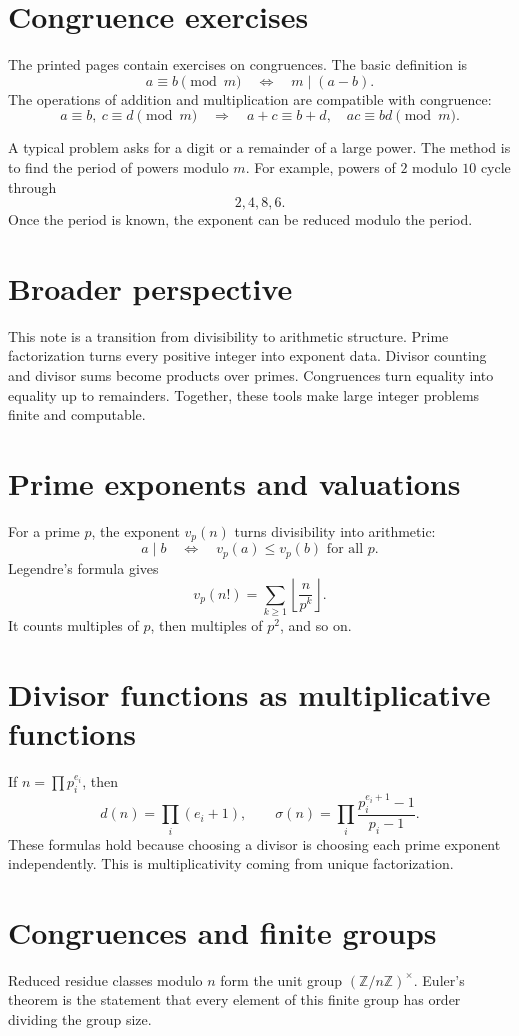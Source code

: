 \section{Congruence exercises}

The printed pages contain exercises on congruences.  The basic definition is
\[
  a\equiv b\pmod m
  \quad\Longleftrightarrow\quad
  m\mid(a-b).
\]
The operations of addition and multiplication are compatible with congruence:
\[
  a\equiv b,\ c\equiv d\pmod m
  \quad\Longrightarrow\quad
  a+c\equiv b+d,\quad ac\equiv bd\pmod m.
\]

A typical problem asks for a digit or a remainder of a large power.  The method is to find the period of powers modulo $m$.  For example, powers of $2$ modulo $10$ cycle through
\[
  2,4,8,6.
\]
Once the period is known, the exponent can be reduced modulo the period.

\section{Broader perspective}

This note is a transition from divisibility to arithmetic structure.  Prime factorization turns every positive integer into exponent data.  Divisor counting and divisor sums become products over primes.  Congruences turn equality into equality up to remainders.  Together, these tools make large integer problems finite and computable.

\section{Prime exponents and valuations}
For a prime \(p\), the exponent \(v_p(n)\) turns divisibility into arithmetic:
\[
a\mid b \quad\Longleftrightarrow\quad v_p(a)\le v_p(b)\text{ for all }p.
\]
Legendre's formula gives
\[
v_p(n!)=\sum_{k\ge1}\left\lfloor \frac n{p^k}\right\rfloor.
\]
It counts multiples of \(p\), then multiples of \(p^2\), and so on.
\section{Divisor functions as multiplicative functions}
If \(n=\prod p_i^{e_i}\), then
\[
d(n)=\prod_i(e_i+1),\qquad \sigma(n)=\prod_i\frac{p_i^{e_i+1}-1}{p_i-1}.
\]
These formulas hold because choosing a divisor is choosing each prime exponent independently.  This is multiplicativity coming from unique factorization.
\section{Congruences and finite groups}
Reduced residue classes modulo \(n\) form the unit group \((\mathbb Z/n\mathbb Z)^\times\).  Euler's theorem is the statement that every element of this finite group has order dividing the group size.
